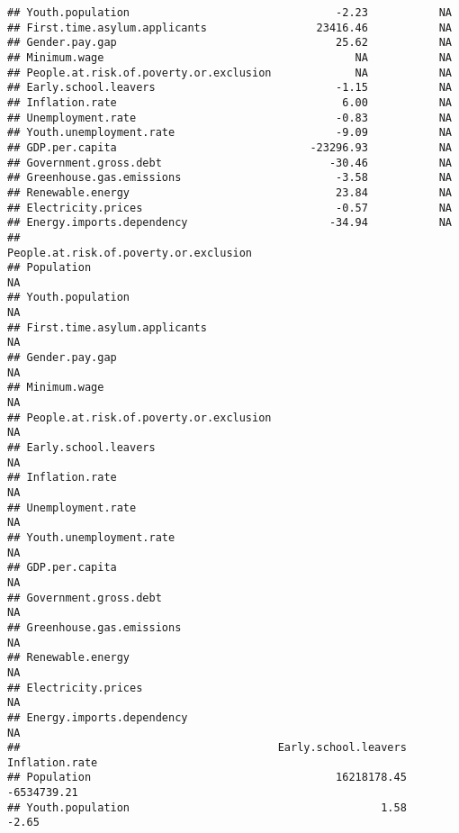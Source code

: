 \documentclass[
]{article}
\begin{document}
\begin{verbatim}
## Youth.population                                -2.23           NA
## First.time.asylum.applicants                 23416.46           NA
## Gender.pay.gap                                  25.62           NA
## Minimum.wage                                       NA           NA
## People.at.risk.of.poverty.or.exclusion             NA           NA
## Early.school.leavers                            -1.15           NA
## Inflation.rate                                   6.00           NA
## Unemployment.rate                               -0.83           NA
## Youth.unemployment.rate                         -9.09           NA
## GDP.per.capita                              -23296.93           NA
## Government.gross.debt                          -30.46           NA
## Greenhouse.gas.emissions                        -3.58           NA
## Renewable.energy                                23.84           NA
## Electricity.prices                              -0.57           NA
## Energy.imports.dependency                      -34.94           NA
##                                        People.at.risk.of.poverty.or.exclusion
## Population                                                                 NA
## Youth.population                                                           NA
## First.time.asylum.applicants                                               NA
## Gender.pay.gap                                                             NA
## Minimum.wage                                                               NA
## People.at.risk.of.poverty.or.exclusion                                     NA
## Early.school.leavers                                                       NA
## Inflation.rate                                                             NA
## Unemployment.rate                                                          NA
## Youth.unemployment.rate                                                    NA
## GDP.per.capita                                                             NA
## Government.gross.debt                                                      NA
## Greenhouse.gas.emissions                                                   NA
## Renewable.energy                                                           NA
## Electricity.prices                                                         NA
## Energy.imports.dependency                                                  NA
##                                        Early.school.leavers Inflation.rate
## Population                                      16218178.45    -6534739.21
## Youth.population                                       1.58          -2.65

\end{verbatim}
\end{document}
